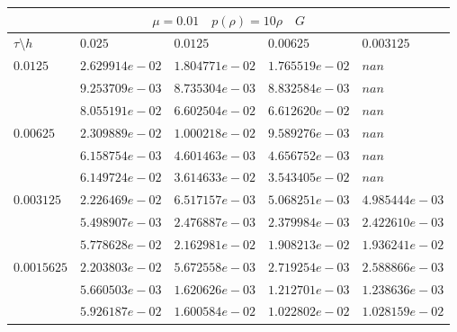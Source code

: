 \documentclass[a4paper,12pt]{extarticle}
\begin{document}
\begin{tabular}{|l|l|l|l|l|}
	\hline
	\multicolumn{5}{|c|}{$\mu =0.01 \quad  p(\rho) =10 \rho \quad G$}\\
	\hline
	$\tau\setminus h$ & $0.025$ & $0.0125$ & $0.00625$ & $0.003125$\\
	\hline
	$0.0125$  & $2.629914e-02$ & $1.804771e-02$ & $1.765519e-02$ & $nan$\\
	& $9.253709e-03$ & $8.735304e-03$ & $8.832584e-03$ & $nan$\\
	& $8.055191e-02$ & $6.602504e-02$ & $6.612620e-02$ & $nan$\\
	\hline
	$0.00625$  & $2.309889e-02$ & $1.000218e-02$ & $9.589276e-03$ & $nan$\\
	& $6.158754e-03$ & $4.601463e-03$ & $4.656752e-03$ & $nan$\\
	& $6.149724e-02$ & $3.614633e-02$ & $3.543405e-02$ & $nan$\\
	\hline
	$0.003125$  & $2.226469e-02$ & $6.517157e-03$ & $5.068251e-03$ & $4.985444e-03$\\
	& $5.498907e-03$ & $2.476887e-03$ & $2.379984e-03$ & $2.422610e-03$\\
	& $5.778628e-02$ & $2.162981e-02$ & $1.908213e-02$ & $1.936241e-02$\\
	\hline
	$0.0015625$  & $2.203803e-02$ & $5.672558e-03$ & $2.719254e-03$ & $2.588866e-03$\\
	& $5.660503e-03$ & $1.620626e-03$ & $1.212701e-03$ & $1.238636e-03$\\
	& $5.926187e-02$ & $1.600584e-02$ & $1.022802e-02$ & $1.028159e-02$\\
	\hline
\end{tabular}
\end{document}
